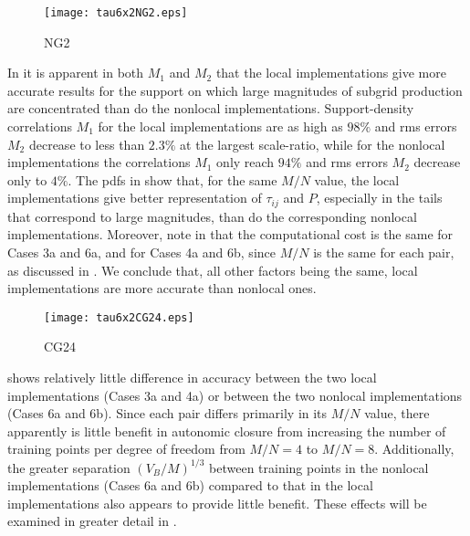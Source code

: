 %
\begin{figure}
	\begin{center}
	\texttt{[image: tau6x2NG2.eps]}
	\caption{NG2}
	\label{F:NG2}
	\end{center}
\end{figure}
%
%

In  it is apparent in both $M_1$  and $M_2$  that the local implementations give more accurate results for the support on which large magnitudes of subgrid production are concentrated than do the nonlocal implementations. Support-density correlations $M_1$ for the local implementations are as high as $98\%$ and rms errors $M_2$  decrease to less than $2.3\%$  at the largest scale-ratio, while for the nonlocal implementations the correlations $M_1$  only reach $94\%$ and rms errors $M_2$  decrease only to $4\%$. The pdfs in   show that, for the same $M/N$  value, the local implementations give better representation of  $\tau_{ij}$ and $P$, especially in the tails that correspond to large magnitudes, than do the corresponding nonlocal implementations. Moreover, note in  that the computational cost is the same for Cases 3a and 6a, and for Cases 4a and 6b, since  $M/N$ is the same for each pair, as discussed in . We conclude that, all other factors being the same, local implementations are more accurate than nonlocal ones. 

%
\begin{figure}
	\begin{center}
	\texttt{[image: tau6x2CG24.eps]}
	\caption{CG24}
	\label{F:CG24}
	\end{center}
\end{figure}
%
%

 shows relatively little difference in accuracy between the two local implementations (Cases 3a and 4a) or between the two nonlocal implementations (Cases 6a and 6b). Since each pair differs primarily in its  $M/N$ value, there apparently is little benefit in autonomic closure from increasing the number of training points per degree of freedom from  $M/N = 4$ to  $M/N = 8$. Additionally, the greater separation  $(V_B/M)^{1/3}$ between training points in the nonlocal implementations (Cases 6a and 6b) compared to that in the local implementations also appears to provide little benefit. These effects will be examined in greater detail in .

